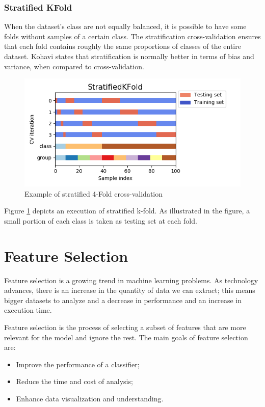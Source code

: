 \subsubsection{Stratified KFold}

When the dataset's class are not equally balanced, it is possible to have some folds without samples of a certain class. The stratification cross-validation ensures that each fold contains roughly the same proportions of classes of the entire dataset. Kohavi \cite{kohavi1995study} states that stratification is normally better in terms of bias and variance, when compared to cross-validation.

\begin{figure}[!h]
	\centering
	\includegraphics[width=1.0\columnwidth]{stratified}
	\caption{Example of stratified 4-Fold cross-validation}
	\label{fig:stratified}
\end{figure}

Figure \ref{fig:stratified} depicts an execution of stratified k-fold. As illustrated in the figure, a small portion of each class is taken as testing set at each fold.





\section{Feature Selection}
\label{sec:feat_sel}
Feature selection is a growing trend in machine learning problems. As technology advances, there is an increase in the quantity of data we can extract; this means bigger datasets to analyze and a decrease in performance and an increase in execution time. 

Feature selection \cite{guyon2003introduction} is the process of selecting a subset of features that are more relevant for the model and ignore the rest.
The main goals of feature selection are: 
\begin{itemize}
	\item Improve the performance of a classifier;
	\item Reduce the time and cost of analysis;
	\item Enhance data visualization and understanding.
\end{itemize}


